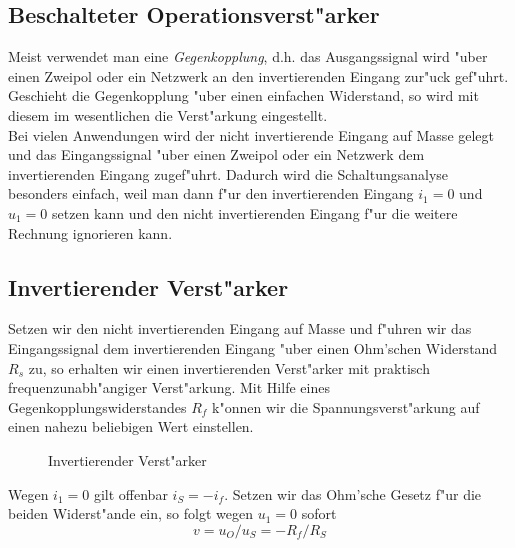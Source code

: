 \documentclass[german, 10pt, a4paper, headsepline]{scrreprt}
\theoremstyle{remark}
\begin{document}
\subsection{Beschalteter Operationsverst"arker}

Meist verwendet man eine \textit{Gegenkopplung}, d.h. das Ausgangssignal wird "uber einen Zweipol oder ein Netzwerk an den invertierenden Eingang zur"uck gef"uhrt. Geschieht die Gegenkopplung "uber einen einfachen Widerstand, so wird mit diesem im wesentlichen die Verst"arkung eingestellt.\\

Bei vielen Anwendungen wird der nicht invertierende Eingang auf Masse gelegt und das Eingangssignal "uber einen Zweipol oder ein Netzwerk dem invertierenden Eingang zugef"uhrt. Dadurch wird die Schaltungsanalyse besonders einfach, weil man dann f"ur den invertierenden Eingang $i_1 = 0$ und $u_1 = 0$ setzen kann und den nicht invertierenden Eingang f"ur die weitere Rechnung ignorieren kann.

\subsection{Invertierender Verst"arker}

Setzen wir den nicht invertierenden Eingang auf Masse und f"uhren wir das Eingangssignal dem invertierenden Eingang "uber einen Ohm'schen Widerstand $R_s$ zu, so erhalten wir einen invertierenden Verst"arker mit praktisch frequenzunabh"angiger Verst"arkung. Mit Hilfe eines Gegenkopplungswiderstandes $R_f$ k"onnen wir die Spannungsverst"arkung auf einen nahezu beliebigen Wert einstellen.

\begin{figure}[hbt]
 
 \centerline{\box\graph}
 \caption{Invertierender Verst"arker}
 \label{opamp_invverst}
\end{figure}

Wegen $i_1 = 0$ gilt offenbar $i_S = -i_f$. Setzen wir das Ohm'sche Gesetz f"ur die beiden Widerst"ande ein, so folgt wegen $u_1 = 0$ sofort
\begin{displaymath}
	v = u_O / u_S = -R_f/R_S
\end{displaymath}

% 
\end{document}
